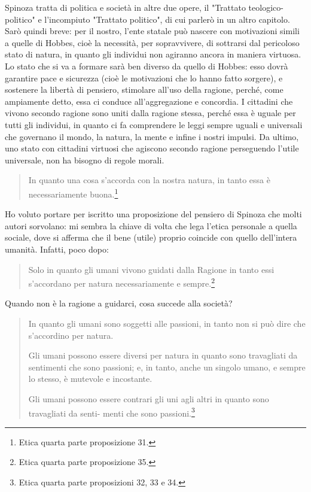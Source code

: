 Spinoza tratta di politica e società in altre due opere, il "Trattato teologico-politico" e l'incompiuto "Trattato politico", di cui parlerò in un altro capitolo. Sarò quindi breve: per il nostro, l'ente statale può nascere con motivazioni simili a quelle di Hobbes, cioè la necessità, per sopravvivere, di sottrarsi dal pericoloso stato di natura, in quanto gli individui non agiranno ancora in maniera virtuosa. Lo stato che si va a formare sarà ben diverso da quello di Hobbes: esso dovrà garantire pace e sicurezza (cioè le motivazioni che lo hanno fatto sorgere), e sostenere la libertà di pensiero, stimolare all'uso della ragione, perché, come ampiamente detto, essa ci conduce all'aggregazione e concordia. I cittadini che vivono secondo ragione sono uniti dalla ragione stessa, perché essa è uguale per tutti gli individui, in quanto ci fa comprendere le leggi sempre uguali e universali che governano il mondo, la natura, la mente e infine i nostri impulsi. Da ultimo, uno stato con cittadini virtuosi che agiscono secondo ragione perseguendo l'utile universale, non ha bisogno di regole morali.

\begin{quotation}
	\small In quanto una cosa s’accorda con la nostra natura, in tanto essa è necessariamente buona.\footnote{Etica quarta parte proposizione 31.}
\end{quotation}

Ho voluto portare per iscritto una proposizione del pensiero di Spinoza che molti autori sorvolano: mi sembra la chiave di volta che lega l'etica personale a quella sociale, dove si afferma che il bene (utile) proprio coincide con quello dell'intera umanità. Infatti, poco dopo:

\begin{quotation}
	\small Solo in quanto gli umani vivono guidati dalla Ragione in tanto essi s’accordano per natura necessariamente e sempre.\footnote{Etica quarta parte proposizione 35.}
\end{quotation}

Quando non è la ragione a guidarci, cosa succede alla società?

\begin{quotation}
	\small In quanto gli umani sono soggetti alle passioni, in tanto non si può dire che s’accordino
	per natura.
	
	Gli umani possono essere diversi per natura in quanto sono travagliati da sentimenti che
	sono passioni; e, in tanto, anche un singolo umano, e sempre lo stesso, è mutevole e incostante.
	
	Gli umani possono essere contrari gli uni agli altri in quanto sono travagliati da senti-
	menti che sono passioni.\footnote{Etica quarta parte proposizioni 32, 33 e 34.}
\end{quotation}

